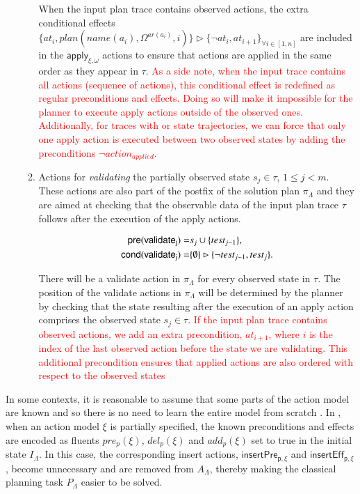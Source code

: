 \begin{itemize}
\begin{enumerate}
When the input plan trace contains observed actions, the extra conditional effects
$\{at_{i},plan(name(a_i),\Omega^{ar(a_i)},i)\}\rhd\{\neg at_{i},at_{i+1}\}_{\forall i\in [1,n]}$ are included in the $\mathsf{apply_{\xi,\omega}}$ actions to ensure that actions are applied in the same order as they appear in $\tau$. \textcolor{red}{As a side note, when the input trace contains all actions (\FO sequence of actions), this conditional effect is redefined as regular preconditions and effects. Doing so will make it impossible for the planner to execute apply actions outside of the observed ones. Additionally, for traces with \POstar or \FO state trajectories, we can force that only one apply action is executed between two observed states by adding the preconditions $\neg action_{applied}$.}\\

\item Actions for {\em validating} the partially observed state $s_j\in\tau$, {\tt\small $1\leq j< m$}. These actions are also part of the postfix of the solution plan $\pi_\Lambda$ and they are aimed at checking that the observable data of the input plan trace $\tau$ follows after the execution of the apply actions.

\begin{small}
\begin{align*}
\hspace*{7pt}\mathsf{pre}(\mathsf{validate_{j}})=&s_j\cup\{test_{j-1}\},\\
\mathsf{cond}(\mathsf{validate_{j}})=&\{\emptyset\}\rhd\{\neg test_{j-1}, test_j\}.
\end{align*}
\end{small}

There will be a validate action in $\pi_\Lambda$ for every observed state in $\tau$. The position of the validate actions in $\pi_\Lambda$ will be determined by the planner by checking that the state resulting after the execution of an apply action comprises the observed state $s_j\in\tau$. \textcolor{red}{If the input plan trace contains observed actions, we add an extra precondition, $at_{i+1}$, where $i$ is the index of the last observed action before the state we are validating. This additional precondition ensures that applied actions are also ordered with respect to the observed states}


\end{enumerate}
\end{itemize}




In some contexts, it is reasonable to assume that some parts of the action model are known and so there is no need to learn the entire model from scratch \cite{ZhuoNK13}. In \FAMA, when an action model $\xi$ is partially specified, the known preconditions and effects are encoded as fluents $pre_p(\xi)$, $del_p(\xi)$ and $add_p(\xi)$ set to true in the initial state $I_{\Lambda}$. In this case, the corresponding insert actions, $\mathsf{insertPre_{p,\xi}}$ and $\mathsf{insertEff_{p,\xi}}$, become unnecessary and are removed from $A_{\Lambda}$, thereby making the classical planning task $P_{\Lambda}$ easier to be solved.

